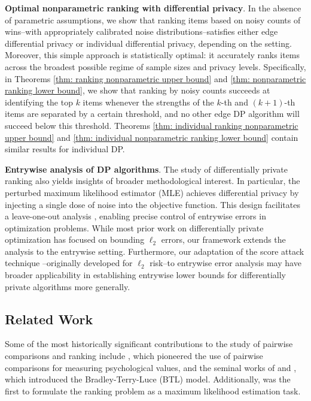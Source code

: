 \documentclass[letterpaper,12pt]{article}
\numberwithin{equation}{section}
\theoremstyle{plain}
\numberwithin{Theorem}{section}
\numberwithin{corollary}{section}
\numberwithin{proposition}{section}
\numberwithin{Lemma}{section}
{
	\theoremstyle{definition}
	\newtheorem{Definition}{Definition}
	\newtheorem{example}{Example}
	\numberwithin{example}{section}
	\newtheorem{fact}{Fact}
	\numberwithin{fact}{section}
	\newtheorem{remark}{Remark}
}
\newcommand{\1}{\mathbbm{1}}
\begin{document}
{\bf Optimal nonparametric ranking with differential privacy}. In the absence of parametric assumptions, we show that ranking items based on noisy counts of wins--with appropriately calibrated noise distributions--satisfies either edge differential privacy or individual differential privacy, depending on the setting. Moreover, this simple approach is statistically optimal: it accurately ranks items across the broadest possible regime of sample sizes and privacy levels.  Specifically, in Theorems \ref{thm: ranking nonparametric upper bound} and \ref{thm: nonparametric ranking lower bound}, we show that ranking by noisy counts succeeds at identifying the top $k$ items whenever the strengths of the $k$-th and $(k+1)$-th items are separated by a certain threshold, and no other edge DP algorithm will succeed below this threshold. Theorems \ref{thm: individual ranking nonparametric upper bound} and \ref{thm: individual nonparametric ranking lower bound} contain similar results for individual DP.

{\bf Entrywise analysis of DP algorithms}. The study of differentially private ranking also yields insights of broader methodological interest. In particular, the perturbed maximum likelihood estimator (MLE) achieves differential privacy by injecting a single dose of noise into the objective function. This design facilitates a leave-one-out analysis \cite{chen2019spectral}, enabling precise control of entrywise errors in optimization problems. While most prior work on differentially private optimization has focused on bounding $\ell_2$ errors, our framework extends the analysis to the entrywise setting. Furthermore, our adaptation of the score attack technique \cite{cai2023score}--originally developed for $\ell_2$  risk--to entrywise error analysis may have broader applicability in establishing entrywise lower bounds for differentially private algorithms more generally.
  
 

\vspace{-5mm}
\subsection{Related Work}

Some of the most historically significant contributions to the study of pairwise comparisons and ranking include \cite{thurstone1927law}, which pioneered the use of pairwise comparisons for measuring psychological values, and the seminal works of \cite{bradley1952rank} and \cite{luce1959individual}, which introduced the Bradley-Terry-Luce (BTL) model. Additionally, \cite{ford1957solution} was the first to formulate the ranking problem as a maximum likelihood estimation task.
\end{document}

